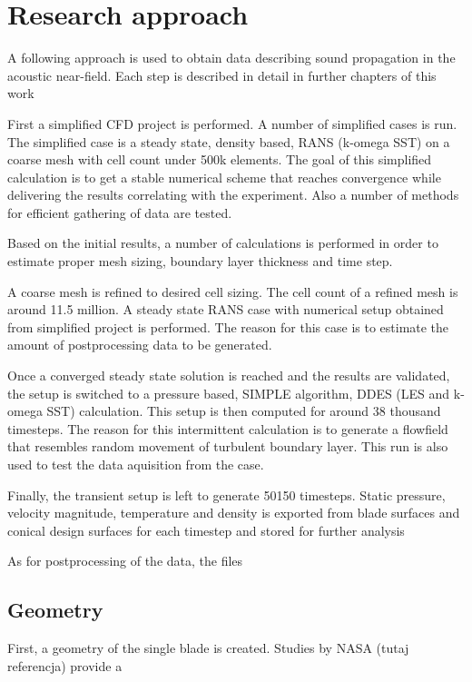 
\section{Research approach}
A following approach is used to obtain data describing sound propagation in the acoustic near-field. Each step is described in detail in further chapters of this work

First a simplified CFD project is performed. A number of simplified cases is run. The simplified case is a steady state, density based, RANS (k-omega SST) on a coarse mesh with cell count under 500k elements. The goal of this simplified calculation is to get a stable numerical scheme that reaches convergence while delivering the results correlating with the experiment. Also a number of methods for efficient gathering of data are tested.  

Based on the initial results, a number of calculations is performed in order to estimate proper mesh sizing, boundary layer thickness and time step. 

A coarse mesh is refined to desired cell sizing. The cell count of a refined mesh is around 11.5 million. A steady state RANS case with numerical setup obtained from simplified project is performed. The reason for this case is to estimate the amount of postprocessing data to be generated.

Once a converged steady state solution is reached and the results are validated, the setup is switched to a pressure based, SIMPLE algorithm, DDES (LES and k-omega SST) calculation.   This setup is then computed for around 38 thousand timesteps. The reason for this intermittent calculation is to generate a flowfield that resembles random movement of turbulent boundary layer. This run is also used to test the data aquisition from the case.

Finally, the transient setup is left to generate 50150 timesteps. Static pressure, velocity magnitude, temperature and density is exported from blade surfaces and conical design surfaces for each timestep and stored for further analysis

As for postprocessing of the data, the files 


\subsection{Geometry}
First, a geometry of the single blade is created. Studies by NASA (tutaj referencja) provide a 


